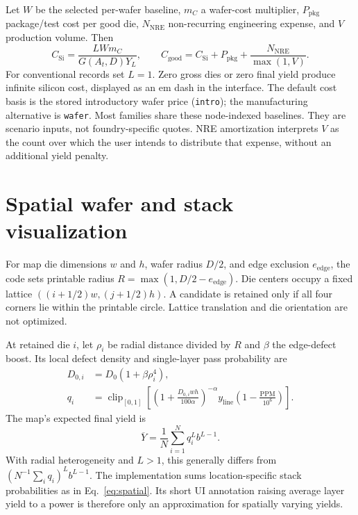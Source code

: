 \documentclass[11pt,a4paper]{article}
\begin{document}
Let $W$ be the selected per-wafer baseline, $m_C$ a wafer-cost multiplier,
$P_{\mathrm{pkg}}$ package/test cost per good die, $N_{\mathrm{NRE}}$
non-recurring engineering expense, and $V$ production volume. Then
\begin{equation}
C_{\mathrm{Si}}=\frac{L W m_C}{G(A_t,D)Y_L},\qquad
C_{\mathrm{good}}=C_{\mathrm{Si}}+P_{\mathrm{pkg}}
                       +\frac{N_{\mathrm{NRE}}}{\max(1,V)}. \label{eq:cost}
\end{equation}
For conventional records set $L=1$. Zero gross dies or zero final yield
produce infinite silicon cost, displayed as an em dash in the interface.
The default cost basis is the stored introductory wafer price
(\texttt{intro}); the manufacturing alternative is \texttt{wafer}. Most
families share these node-indexed baselines. They are scenario inputs, not
foundry-specific quotes. NRE amortization interprets $V$ as the count over
which the user intends to distribute that expense, without an additional
yield penalty.

\section{Spatial wafer and stack visualization}
For map die dimensions $w$ and $h$, wafer radius $D/2$, and edge exclusion
$e_{\mathrm{edge}}$, the code sets printable radius
$R=\max(1,D/2-e_{\mathrm{edge}})$. Die centers occupy a fixed lattice
$((i+1/2)w,(j+1/2)h)$. A candidate is retained only if all four corners lie
within the printable circle. Lattice translation and die orientation are
not optimized.

At retained die $i$, let $\rho_i$ be radial distance divided by $R$ and
$\beta$ the edge-defect boost. Its local defect density and single-layer
pass probability are
\begin{align}
D_{0,i} &= D_0(1+\beta\rho_i^4),\\
q_i &= \operatorname{clip}_{[0,1]}\left[
  \left(1+\frac{D_{0,i}wh}{100\alpha}\right)^{-\alpha}
  y_{\mathrm{line}}\left(1-\frac{\mathrm{PPM}}{10^6}\right)\right].
\end{align}
The map's expected final yield is
\begin{equation}
\overline{Y}=\frac{1}{N}\sum_{i=1}^N q_i^L b^{L-1}. \label{eq:spatial}
\end{equation}
With radial heterogeneity and $L>1$, this generally differs from
$(N^{-1}\sum_i q_i)^L b^{L-1}$. The implementation sums location-specific
stack probabilities as in Eq.~\ref{eq:spatial}. Its short UI annotation
raising average layer yield to a power is therefore only an approximation
for spatially varying yields.
\end{document}
